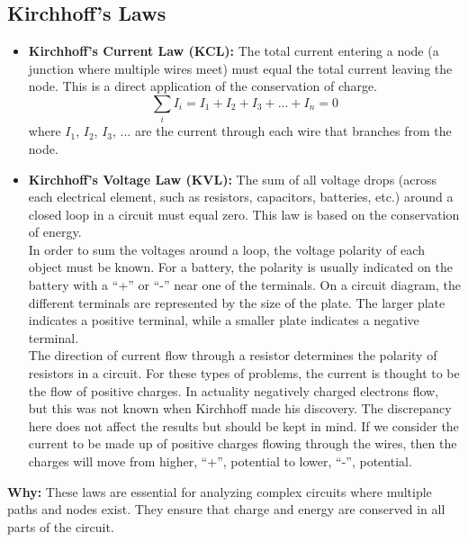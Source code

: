 \documentclass[11pt]{article}
\begin{document}
    \subsection{Kirchhoff's Laws}
        \begin{itemize}
            \item \textbf{Kirchhoff's Current Law (KCL):} The total current entering a node (a junction where multiple wires meet) must equal the total current leaving the node.
                This is a direct application of the conservation of charge.\\
                $$
                \sum_i I_i = I_1 + I_2 + I_3 + ... + I_n = 0
                $$
                where $I_1$, $I_2$, $I_3$, ... are the current through each wire that branches from the node.
            \item \textbf{Kirchhoff's Voltage Law (KVL):} The sum of all voltage drops (across each electrical element, such as resistors, capacitors, batteries, etc.) around a closed loop in a circuit must equal zero.
                This law is based on the conservation of energy.\\
                In order to sum the voltages around a loop, the voltage polarity of each object must be known.
                For a battery, the polarity is usually indicated on the battery with a “+” or “-” near one of the terminals.
                On a circuit diagram, the different terminals are represented by the size of the plate.
                The larger plate indicates a positive terminal, while a smaller plate indicates a negative terminal.\\
                The direction of current flow through a resistor determines the polarity of resistors in a circuit.
                For these types of problems, the current is thought to be the flow of positive charges.
                In actuality negatively charged electrons flow, but this was not known when Kirchhoff made his discovery.
                The discrepancy here does not affect the results but should be kept in mind.
                If we consider the current to be made up of positive charges flowing through the wires, then the charges will move from higher, “+”, potential to lower, “-”, potential.
        \end{itemize}
        \textbf{Why:} These laws are essential for analyzing complex circuits where multiple paths and nodes exist.
        They ensure that charge and energy are conserved in all parts of the circuit.
\end{document}
